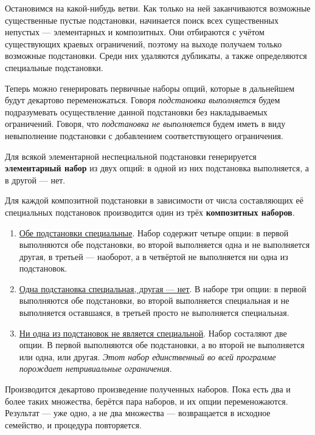 \documentclass[12pt]{article}
\begin{document}
Остановимся на какой-нибудь ветви. Как только на ней заканчиваются возможные
существенные пустые подстановки, начинается поиск всех существенных непустых
--- элементарных и композитных. Они отбираются с учётом существующих краевых
ограничений, поэтому на выходе получаем только возможные подстановки. Среди
них удаляются дубликаты, а также определяются специальные подстановки.

Теперь можно генерировать первичные наборы опций, которые в дальнейшем будут
декартово переменожаться. Говоря \textit{подстановка выполняется} будем
подразумевать осуществление данной подстановки без накладываемых ограничений.
Говоря, что \textit{подстановка не выполняется} будем иметь в виду невыполнение
подстановки с добавлением соответствующего ограничения.

Для всякой элементарной неспециальной подстановки генерируется
\textbf{элементарный набор} из двух опций: в одной из них подстановка
выполняется, а в другой --- нет.

Для каждой композитной подстановки в зависимости от числа составляющих её
специальных подстановок производится один из трёх \textbf{композитных наборов}.
\begin{enumerate}
  \item \underline{Обе подстановки специальные}. Набор содержит четыре опции:
  в первой выполняются обе подстановки, во второй выполняется одна и не
  выполняется другая, в третьей --- наоборот, а в четвёртой не выполняется
  ни одна из подстановок.
  
  \item \underline{Одна подстановка специальная, другая --- нет}. В наборе
  три опции: в первой выполняются обе подстановки, во второй выполняется
  специальная и не выполняется оставшаяся, в третьей просто не выполняется
  специальная.
    
  \item \underline{Ни одна из подстановок не является специальной}. Набор
  состаляют две опции. В первой выполняются обе подстановки, а во второй не
  выполняется или одна, или другая. \textit{Этот набор единственный во
  всей программе порождает нетривиальные ограничения}.
\end{enumerate}

Производится декартово произведение полученных наборов. Пока есть два и более
таких множества, берётся пара наборов, и их опции переменожаются. Результат
--- уже одно, а не два множества --- возвращается в исходное семейство, и
процедура повторяется.
\end{document}
